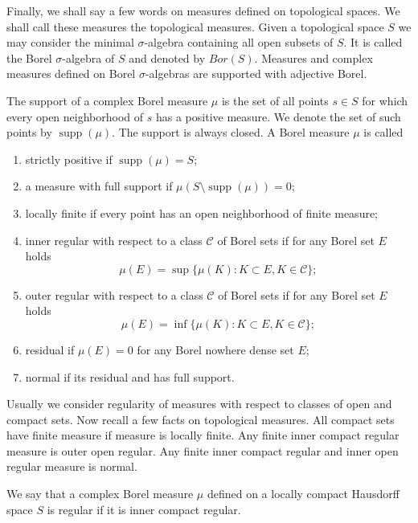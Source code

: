 Finally, we shall say a few words on measures defined on topological spaces. We
shall call these measures the topological measures. Given a topological space $S$ we may 
consider the minimal $\sigma$-algebra containing all open subsets of $S$. 
It is called the Borel $\sigma$-algebra of $S$ and denoted by $Bor(S)$. 
Measures and complex measures defined on Borel $\sigma$-algebras are supported 
with adjective Borel.

The support of a complex Borel measure $\mu$ is the set of all points
$s\in S$ for which every open neighborhood of $s$ has a positive measure. We
denote the set of such points by $\operatorname{supp}(\mu)$. The support is
always closed. A Borel measure $\mu$ is called
\begin{enumerate}[label = (\roman*)]
  \item strictly positive if $\operatorname{supp}(\mu)=S$;

  \item a measure with full support 
  if $\mu(S\setminus\operatorname{supp}(\mu))=0$;

  \item locally finite if every point has an open neighborhood of finite measure; 

  \item inner regular with respect to a
  class $\mathcal{C}$ of Borel sets if for any Borel set $E$ holds 
  $$
  \mu(E)=\sup \{\mu(K): K\subset E, K\in\mathcal{C} \};
  $$

  \item outer regular with respect to a 
  class $\mathcal{C}$ of Borel sets if for any Borel set $E$ holds 
  $$
  \mu(E)=\inf \{\mu(K): K\subset E, K\in\mathcal{C} \};
  $$

  \item residual if $\mu(E)=0$ for any Borel nowhere dense set $E$;

  \item normal if its residual and has full support.
\end{enumerate}

Usually we consider regularity of measures with respect to classes of open and
compact sets. Now recall a few facts on topological measures. All compact sets 
have finite measure if measure is locally finite. Any finite inner compact 
regular measure is outer open regular. Any finite inner compact regular and
inner open regular measure is normal. 

We say that a complex Borel measure $\mu$ defined on a 
locally compact Hausdorff space $S$ is regular if it is inner compact regular.  

